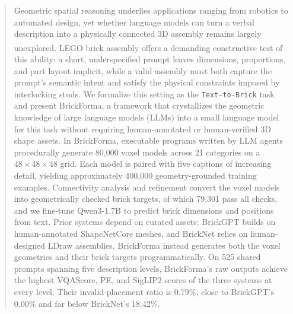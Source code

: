 \begin{abstract}
Geometric spatial reasoning underlies applications ranging from robotics to automated design, yet whether language models can turn a verbal description into a physically connected 3D assembly remains largely unexplored. LEGO\textsuperscript{\tiny\textregistered} brick assembly offers a demanding constructive test of this ability: a short, underspecified prompt leaves dimensions, proportions, and part layout implicit, while a valid assembly must both capture the prompt's semantic intent and satisfy the physical constraints imposed by interlocking studs. We formalize this setting as the \texttt{Text-to-Brick} task and present BrickForma, a framework that crystallizes the geometric knowledge of large language models (LLMs) into a small language model for this task without requiring human-annotated or human-verified 3D shape assets. In BrickForma, executable programs written by LLM agents procedurally generate 80,000 voxel models across 21 categories on a $48\times48\times48$ grid. Each model is paired with five captions of increasing detail, yielding approximately 400,000 geometry-grounded training examples. Connectivity analysis and refinement convert the voxel models into geometrically checked brick targets, of which 79,301 pass all checks, and we fine-tune Qwen3-1.7B to predict brick dimensions and positions from text. Prior systems depend on curated assets: BrickGPT builds on human-annotated ShapeNetCore meshes, and BrickNet relies on human-designed LDraw assemblies. BrickForma instead generates both the voxel geometries and their brick targets programmatically. On 525 shared prompts spanning five description levels, BrickForma's raw outputs achieve the highest VQAScore, PE, and SigLIP2 scores of the three systems at every level. Their invalid-placement ratio is 0.79\%, close to BrickGPT's 0.00\% and far below BrickNet's 18.42\%.
\end{abstract}
